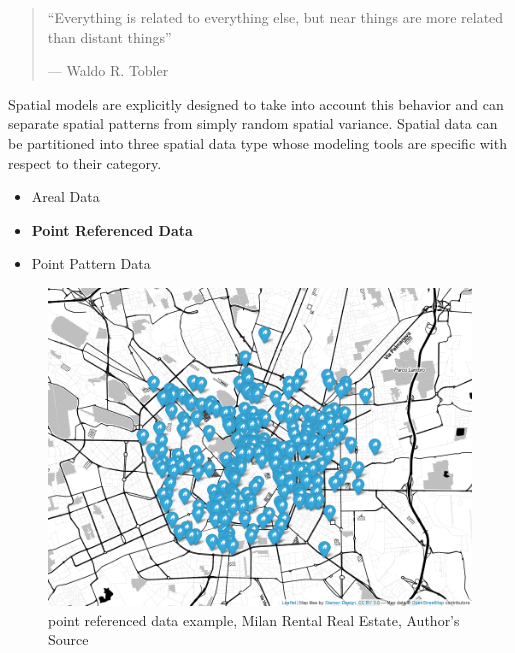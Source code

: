 \documentclass[
  12pt,
  a4paper,
  oneside]{book}
\providecommand{\tightlist}{%
  \setlength{\itemsep}{0pt}\setlength{\parskip}{0pt}}
\theoremstyle{definition}
\theoremstyle{definition}
\theoremstyle{definition}
\theoremstyle{remark}
\begin{document}
\begin{quote}
``Everything is related to everything else,
but near things are more related than distant things''

\hfill --- Waldo R. Tobler
\end{quote}

Spatial models are explicitly designed to take into account this behavior and can separate spatial patterns from simply random spatial variance.
Spatial data can be partitioned into three spatial data type whose modeling tools are specific with respect to their category.

\begin{itemize}
\tightlist
\item
  Areal Data
\item
  \textbf{Point Referenced Data}
\item
  Point Pattern Data
\end{itemize}

\begin{figure}
\centering
\includegraphics{images/map.png}
\caption{point referenced data example, Milan Rental Real Estate, Author's Source}
\end{figure}
\end{document}
